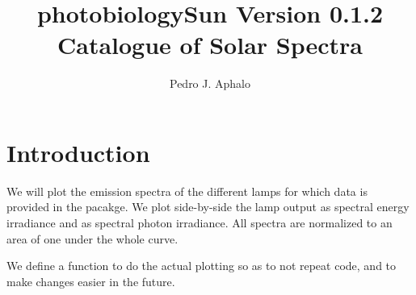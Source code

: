 \documentclass{article}\usepackage{knitr}
\newcommand{\PBSun}{\textsf{photobiologySun}\xspace}
\begin{document}
\title{\PBSun Version 0.1.2\\ Catalogue of Solar Spectra}
\author{Pedro J. Aphalo}

\maketitle

\section{Introduction}

We will plot the emission spectra of the different lamps for which data is provided in the pacakge. We plot side-by-side the lamp output as spectral energy irradiance and as spectral photon irradiance. All spectra are normalized to an area of one under the whole curve.



\begin{knitrout}\footnotesize
{}\color{fgcolor}\begin{kframe}
\begin{alltt}
\end{alltt}


{\ttfamily\noindent\itshape\color{messagecolor}{\#\# Loading required package: lubridate}}\begin{alltt}
\end{alltt}


{\ttfamily\noindent\itshape\color{messagecolor}{\#\# Loading required package: proto\\\#\# Loading required package: splus2R\\\#\# Loading required package: plyr\\\#\# \\\#\# Attaching package: 'plyr'\\\#\# \\\#\# The following object is masked from 'package:lubridate':\\\#\# \\\#\#\ \ \ \  here}}\end{kframe}
\end{knitrout}

We define a function to do the actual plotting so as to not repeat code, and to make changes easier in the future.
\end{document}

